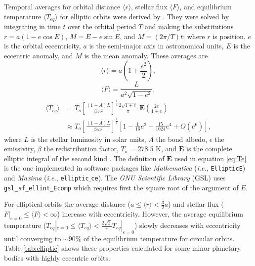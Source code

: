 \documentclass[a4paper,fleqn,usenatbib]{mnras}
\begin{document}
Temporal averages for orbital distance $\langle r \rangle$, stellar flux $\langle F \rangle$, and equilibrium temperature $\langle T_{eq} \rangle$ for elliptic orbits were derived by \citet{2017ApJ...837L...1M}. They were solved by integrating in time $t$ over the orbital period $T$ and making the substitutions $r=a(1-e\cos{E})$, $M=E-e\sin{E}$, and $M=(2\pi/T)t$; where $r$ is position, $e$ is the orbital eccentricity, $a$ is the semi-major axis in astronomical units, $E$ is the eccentric anomaly, and $M$ is the mean anomaly. These averages are
\begin{equation} \label{eq:re}
\langle r \rangle = a\left ( 1+\frac{e^2}{2} \right ),
\end{equation}
\begin{equation} \label{eq:Fe}
\langle F \rangle = \frac{L}{a^2\sqrt{1-e^2}},
\end{equation}
\begin{align} \label{eq:Te}
\langle T_{eq} \rangle & = T_o\left[ \frac{(1-A)L}{\beta \epsilon a^2}\right] ^\frac{1}{4}\frac{2\sqrt{1+e}}{\pi} \; \mathbf{E}\left ( \frac{2e}{1+e} \right ) \\
& \approx T_o\left[ \frac{(1-A)L}{\beta \epsilon a^2}\right] ^\frac{1}{4} \left[ 1 - \tfrac{1}{16}e^2 - \tfrac{15}{1024}e^4 + O(e^6) \right],
\end{align}
where $L$ is the stellar luminosity in solar units, $A$ the bond albedo, $\epsilon$ the emissivity, $\beta$ the redistribution factor, $T_o$ = 278.5 K, and $\mathbf{E}$ is the complete elliptic integral of the second kind \citep{MathWorld, GSL}. The definition of $\mathbf{E}$ used in equation \ref{eq:Te} is the one implemented in software packages like \emph{Mathematica} (\emph{i.e.}, \texttt{EllipticE}) and \emph{Maxima} (\emph{i.e.}, \texttt{elliptic$\_$ce}). The \emph{GNU Scientific Library} (GSL) uses \texttt{gsl\_sf\_ellint\_Ecomp} which requires first the square root of the argument of $E$.

For elliptical orbits the average distance ($a \leq \langle r \rangle < \frac{3}{2}a$) and stellar flux ($F|_{e=0} \leq \langle F \rangle < \infty$) increase with eccentricity. However, the average equilibrium temperature ($T_{eq}|_{e=0} \leq \langle T_{eq} \rangle < \frac{2\sqrt{2}}{\pi} T_{eq}|_{e=0}$) slowly decreases with eccentricity until converging to $\sim90\%$ of the equilibrium temperature for circular orbits. Table \ref{tab:elliptic} shows these properties calculated for some minor planetary bodies with highly eccentric orbits.
\end{document}

